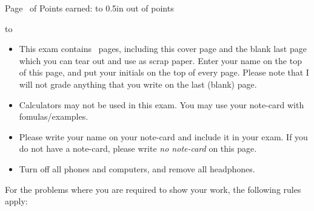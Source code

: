 \documentclass[11pt,answers]{exam}
\begin{document}
\extrawidth{-0.3in}
\pagestyle{headandfoot}

\setlength{\hoffset}{-.25in}

\extraheadheight{-.4in}
\runningheadrule
{} 



\firstpagefooter{\bfseries{}}{}{} 


\runningheader{\bfseries {}}%
              {\bfseries {}}%
              {Page \thepage\ 
							of \numpages 
							}
\runningfooter{} %
                {}
                {Points earned: \hbox to 0.5in{\hrulefill}
                 out of  \pointsonpage{\thepage} points}
                 
						

\vspace*{0.7cm}
\hbox to 
\vspace{0.2in}

\begin{itemize}
	\item This exam contains \numpages\ pages, including this cover page and the blank last page which you can tear out and use as scrap paper. Enter
your name on the top of this page, and put your initials
on the top of every page. Please note that I will not grade anything that you write on the last (blank) page.

\item Calculators may not be used in this exam. You may use your note-card with fomulas/examples. 

\item Please write your name on your note-card and include it in your exam. If you do not have a note-card, please write {\textit {no note-card}} on this page.
\item Turn off all phones and computers, and remove all headphones.

\end{itemize}

For the problems where you are required to show your work, the following rules apply:\\
\end{document}
